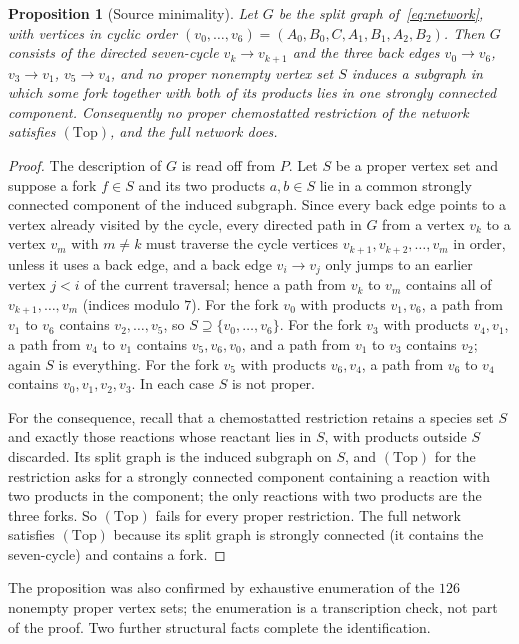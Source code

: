 \documentclass[11pt,a4paper]{article}
\theoremstyle{plain}
\newtheorem{proposition}[theorem]{Proposition}
\theoremstyle{definition}
\theoremstyle{remark}
\numberwithin{equation}{section}
\newcommand{\Top}{\mathrm{(Top)}}
\begin{document}
\begin{proposition}[Source minimality]\label{prop:minimal}
Let $G$ be the split graph of~\eqref{eq:network}, with vertices in cyclic order $(v_0,\dots,v_6)=(A_0,B_0,C,A_1,B_1,A_2,B_2)$. Then $G$ consists of the directed seven-cycle $v_k\to v_{k+1}$ and the three back edges $v_0\to v_6$, $v_3\to v_1$, $v_5\to v_4$, and no proper nonempty vertex set $S$ induces a subgraph in which some fork together with both of its products lies in one strongly connected component. Consequently no proper chemostatted restriction of the network satisfies $\Top$, and the full network does.
\end{proposition}

\begin{proof}
The description of $G$ is read off from $P$. Let $S$ be a proper vertex set and suppose a fork $f\in S$ and its two products $a,b\in S$ lie in a common strongly connected component of the induced subgraph. Since every back edge points to a vertex already visited by the cycle, every directed path in $G$ from a vertex $v_k$ to a vertex $v_m$ with $m\ne k$ must traverse the cycle vertices $v_{k+1},v_{k+2},\dots,v_m$ in order, unless it uses a back edge, and a back edge $v_i\to v_j$ only jumps to an earlier vertex $j<i$ of the current traversal; hence a path from $v_k$ to $v_m$ contains all of $v_{k+1},\dots,v_m$ (indices modulo $7$). For the fork $v_0$ with products $v_1,v_6$, a path from $v_1$ to $v_6$ contains $v_2,\dots,v_5$, so $S\supseteq\{v_0,\dots,v_6\}$. For the fork $v_3$ with products $v_4,v_1$, a path from $v_4$ to $v_1$ contains $v_5,v_6,v_0$, and a path from $v_1$ to $v_3$ contains $v_2$; again $S$ is everything. For the fork $v_5$ with products $v_6,v_4$, a path from $v_6$ to $v_4$ contains $v_0,v_1,v_2,v_3$. In each case $S$ is not proper.

For the consequence, recall that a chemostatted restriction retains a species set $S$ and exactly those reactions whose reactant lies in $S$, with products outside $S$ discarded. Its split graph is the induced subgraph on $S$, and $\Top$ for the restriction asks for a strongly connected component containing a reaction with two products in the component; the only reactions with two products are the three forks. So $\Top$ fails for every proper restriction. The full network satisfies $\Top$ because its split graph is strongly connected (it contains the seven-cycle) and contains a fork.
\end{proof}

The proposition was also confirmed by exhaustive enumeration of the $126$ nonempty proper vertex sets; the enumeration is a transcription check, not part of the proof. Two further structural facts complete the identification.
\end{document}
